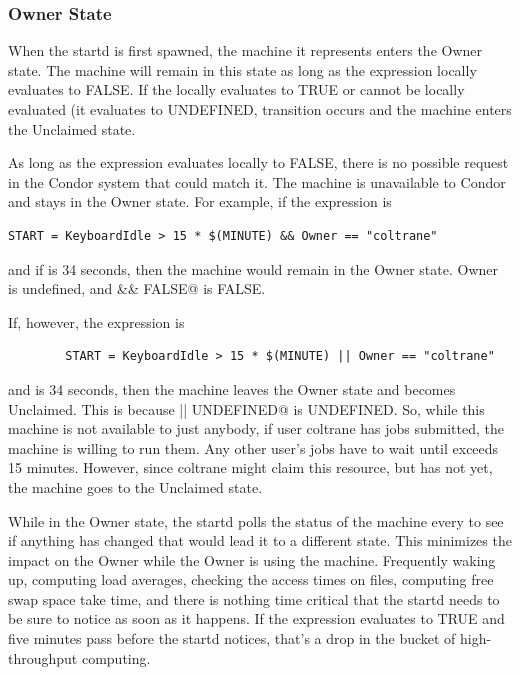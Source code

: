 \subsubsection{\label{sec:Owner-State}
Owner State}

When the startd is first spawned, the machine it represents enters the
Owner state. 
The machine will remain in this state as long as the 
expression locally evaluates to FALSE.
If the  locally evaluates to TRUE or cannot be locally
evaluated (it evaluates to UNDEFINED, transition 
occurs and the machine enters the Unclaimed state.

As long as the  expression evaluates locally to FALSE,
there is no possible request in the Condor system that could match it.
The machine is unavailable to Condor and stays in the Owner state.
For example, if the  expression is
\begin{verbatim}
START = KeyboardIdle > 15 * $(MINUTE) && Owner == "coltrane" 
\end{verbatim}
and if  is 34 seconds,
then the machine would remain in the Owner state.
Owner is undefined, and
\verb@anything && FALSE@ is FALSE.

If, however, the  expression is
\begin{verbatim}
        START = KeyboardIdle > 15 * $(MINUTE) || Owner == "coltrane"
\end{verbatim}
and  is 34 seconds, then the machine
leaves the Owner state and becomes Unclaimed.
This is because
\verb@FALSE || UNDEFINED@ is UNDEFINED.
So, while this machine is not available to just anybody,
if user coltrane has jobs submitted, the machine is willing to run them.
Any other user's jobs have to wait
until  exceeds 15 minutes.
However, since coltrane might claim this resource,
but has not yet, the machine goes to the Unclaimed state.

While in the Owner state, the startd polls the status of the
machine every  to see if anything has changed
that would lead it to a different state.
This minimizes the impact on the Owner
while the Owner is using the machine.
Frequently waking up, computing load averages, checking the access
times on files, computing free swap space take time,
and there is nothing
time critical that the startd needs to be sure to notice as soon as it
happens.
If the  expression evaluates to TRUE and five
minutes pass before the startd notices,
that's a drop in the bucket of high-throughput computing.

